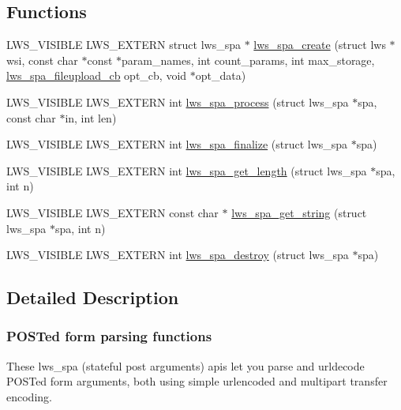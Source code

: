 \subsection*{Functions}
\begin{DoxyCompactItemize}
\item 
L\+W\+S\+\_\+\+V\+I\+S\+I\+B\+LE L\+W\+S\+\_\+\+E\+X\+T\+E\+RN struct lws\+\_\+spa $\ast$ \hyperlink{group__form-parsing_ga162f86762173a2bc8c28497941d74815}{lws\+\_\+spa\+\_\+create} (struct lws $\ast$wsi, const char $\ast$const $\ast$param\+\_\+names, int count\+\_\+params, int max\+\_\+storage, \hyperlink{group__form-parsing_ga5a70527c0861c2ffa3d29333a6aa7f8e}{lws\+\_\+spa\+\_\+fileupload\+\_\+cb} opt\+\_\+cb, void $\ast$opt\+\_\+data)
\item 
L\+W\+S\+\_\+\+V\+I\+S\+I\+B\+LE L\+W\+S\+\_\+\+E\+X\+T\+E\+RN int \hyperlink{group__form-parsing_ga9ad9ebf5ea1a7108415ed7e04cb231d2}{lws\+\_\+spa\+\_\+process} (struct lws\+\_\+spa $\ast$spa, const char $\ast$in, int len)
\item 
L\+W\+S\+\_\+\+V\+I\+S\+I\+B\+LE L\+W\+S\+\_\+\+E\+X\+T\+E\+RN int \hyperlink{group__form-parsing_ga83835bf250ee3d4a60f36a182f2b8d24}{lws\+\_\+spa\+\_\+finalize} (struct lws\+\_\+spa $\ast$spa)
\item 
L\+W\+S\+\_\+\+V\+I\+S\+I\+B\+LE L\+W\+S\+\_\+\+E\+X\+T\+E\+RN int \hyperlink{group__form-parsing_ga3fbe378632f85ec9a14cc2c1687bf05f}{lws\+\_\+spa\+\_\+get\+\_\+length} (struct lws\+\_\+spa $\ast$spa, int n)
\item 
L\+W\+S\+\_\+\+V\+I\+S\+I\+B\+LE L\+W\+S\+\_\+\+E\+X\+T\+E\+RN const char $\ast$ \hyperlink{group__form-parsing_ga2da476217166da02704b90d3a8d4f3cd}{lws\+\_\+spa\+\_\+get\+\_\+string} (struct lws\+\_\+spa $\ast$spa, int n)
\item 
L\+W\+S\+\_\+\+V\+I\+S\+I\+B\+LE L\+W\+S\+\_\+\+E\+X\+T\+E\+RN int \hyperlink{group__form-parsing_gaaa482f07dad3f04b391cccf0a814e13b}{lws\+\_\+spa\+\_\+destroy} (struct lws\+\_\+spa $\ast$spa)
\end{DoxyCompactItemize}


\subsection{Detailed Description}
\subsubsection*{P\+O\+S\+Ted form parsing functions}

These lws\+\_\+spa (stateful post arguments) apis let you parse and urldecode P\+O\+S\+Ted form arguments, both using simple urlencoded and multipart transfer encoding.

